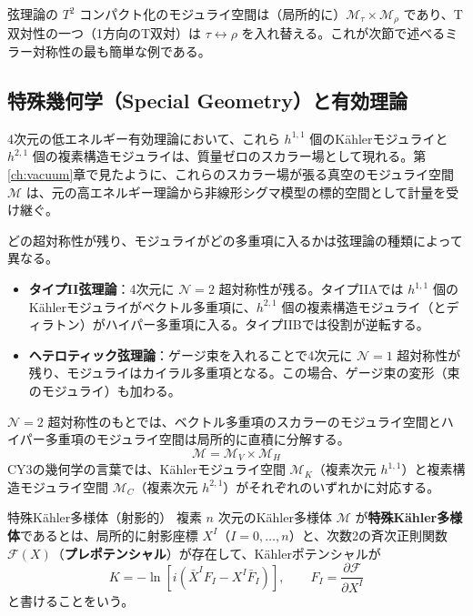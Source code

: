 \documentclass[uplatex, dvipdfmx, book]{jsbook}
\let\origsubsection\subsection
\let\origsubsubsection\subsubsection
\renewcommand{\section}{\origsubsection}
\renewcommand{\subsection}{\origsubsubsection}
\renewcommand{\subsubsection}{\paragraph}
\begin{document}
弦理論の $T^2$ コンパクト化のモジュライ空間は（局所的に）$\mathcal{M}_\tau \times \mathcal{M}_\rho$ であり、T双対性の一つ（1方向のT双対）は $\tau \leftrightarrow \rho$ を入れ替える。これが次節で述べるミラー対称性の最も簡単な例である。

\section{特殊幾何学（Special Geometry）と有効理論}

4次元の低エネルギー有効理論において、これら $h^{1,1}$ 個のK\"ahlerモジュライと $h^{2,1}$ 個の複素構造モジュライは、質量ゼロのスカラー場として現れる。第\ref{ch:vacuum}章で見たように、これらのスカラー場が張る真空のモジュライ空間 $\mathcal{M}$ は、元の高エネルギー理論から非線形シグマ模型の標的空間として計量を受け継ぐ。

どの超対称性が残り、モジュライがどの多重項に入るかは弦理論の種類によって異なる。
\begin{itemize}
    \item \textbf{タイプII弦理論}：4次元に $\mathcal{N} = 2$ 超対称性が残る。タイプIIAでは $h^{1,1}$ 個のK\"ahlerモジュライがベクトル多重項に、$h^{2,1}$ 個の複素構造モジュライ（とディラトン）がハイパー多重項に入る。タイプIIBでは役割が逆転する。
    \item \textbf{ヘテロティック弦理論}：ゲージ束を入れることで4次元に $\mathcal{N} = 1$ 超対称性が残り、モジュライはカイラル多重項となる。この場合、ゲージ束の変形（束のモジュライ）も加わる。
\end{itemize}

$\mathcal{N} = 2$ 超対称性のもとでは、ベクトル多重項のスカラーのモジュライ空間とハイパー多重項のモジュライ空間は局所的に直積に分解する。
\begin{equation}
    \mathcal{M} = \mathcal{M}_{V} \times \mathcal{M}_{H}
\end{equation}
CY3の幾何学の言葉では、K\"ahlerモジュライ空間 $\mathcal{M}_K$（複素次元 $h^{1,1}$）と複素構造モジュライ空間 $\mathcal{M}_C$（複素次元 $h^{2,1}$）がそれぞれのいずれかに対応する。

\begin{mydef}{特殊K\"ahler多様体（射影的）}{}
複素 $n$ 次元のK\"ahler多様体 $\mathcal{M}$ が\textbf{特殊K\"ahler多様体}であるとは、局所的に射影座標 $X^I$（$I = 0, \dots, n$）と、次数2の斉次正則関数 $\mathcal{F}(X)$（\textbf{プレポテンシャル}）が存在して、K\"ahlerポテンシャルが
\begin{equation*}
    K = -\ln\left[ i\left( \bar{X}^I F_I - X^I \bar{F}_I \right) \right], \qquad F_I = \frac{\partial\mathcal{F}}{\partial X^I}
\end{equation*}
と書けることをいう。
\end{mydef}
\end{document}
